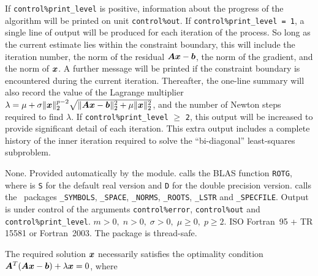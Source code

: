 \documentclass{galahad}
\newcommand{\packagename}{L2\-RT}
\begin{document}

\galinfo
If {\tt control\%print\_level} is positive, information about the progress
of the algorithm will be printed on unit {\tt control\-\%\-out}.
If {\tt control\%print\_level = 1}, a single line of output will be produced
for each iteration of the process. So long as the current estimate lies
within the constraint boundary, this will include
the iteration number, the norm of the residual ${\bm{A}}{\bm{x}}-{\bm{b}}$, the
norm of the gradient, and the norm of ${\bm{x}}$.
A further message will be printed
if the constraint boundary is encountered during the current iteration.
Thereafter, the one-line summary will also record the value of the Lagrange
multiplier
$\lambda = \mu + \sigma \|{\bm{x}}\|_2^{p-2}
 \sqrt{\| {\bm{A}} {\bm{x}} - {\bm{b}} \|_2^2 + \mu \|{\bm{x}}\|_2^2}$,
and the number of Newton steps required to find $\lambda$.
If {\tt control\%print\_level} $\geq$ {\tt 2}, this
output will be increased to provide significant detail of each iteration.
This extra output includes a complete history of the inner iteration required
to solve the ``bi-diagonal'' least-squares subproblem.


\galgeneral

\galcommon None.
\galworkspace Provided automatically by the module.
\galroutines {\tt \packagename\_solve} calls the
BLAS function {\tt *ROTG}, where {\tt *} is {\tt S} for
the default real version and {\tt D} for the double precision version.
\galmodules {\tt \packagename\_solve} calls the \galahad\ packages
{\tt \libraryname\_SY\-M\-BOLS},
{\tt \libraryname\_SPACE},
{\tt \libraryname\_NORMS},
{\tt \libraryname\_\-ROOTS},
{\tt \libraryname\_LSTR} and
{\tt \libraryname\_SPECFILE}.
\galio Output is under control of the arguments
{\tt control\%error}, {\tt control\%out} and {\tt control\%print\_level}.
\galrestrictions $m > 0, \; n  >  0, \;  \sigma  >  0,  \;
 \mu  \geq  0, \; p \geq 2$.
\galportability ISO Fortran~95 + TR 15581 or Fortran~2003.
The package is thread-safe.


\galmethod
The required solution ${\bm{x}}$ necessarily satisfies the optimality condition
${\bm{A}}^T ( {\bm{A}} {\bm{x}} - {\bm{b}} ) + \lambda {\bm{x}} = 0$, where
\end{document}
